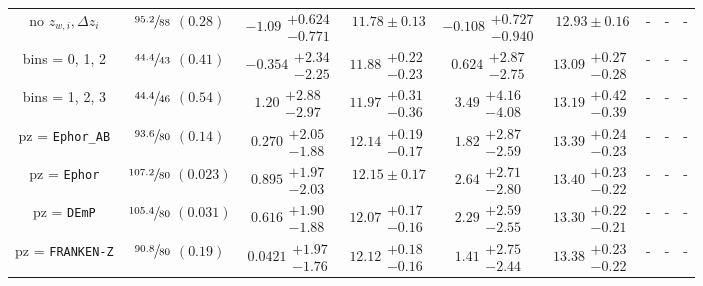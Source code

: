 \documentclass[a4paper,11pt]{article}
\begin{document}
\begin{table}
\begin{center}
\begin{tabular}{ccccccccc}
            no $z_{w, i}, \Delta z_{i}$ & $\sfrac{95.2}{88}$ $(0.28)$ & $-1.09\substack{+0.624 \\ -0.771}$ & $11.78 \pm 0.13$ & $-0.108\substack{+0.727 \\ -0.940}$ & $12.93 \pm 0.16$ & - & - & - \\
            bins = 0, 1, 2 & $\sfrac{44.4}{43}$ $(0.41)$ & $-0.354\substack{+2.34 \\ -2.25}$ & $11.88\substack{+0.22 \\ -0.23}$ & $0.624\substack{+2.87 \\ -2.75}$ & $13.09\substack{+0.27 \\ -0.28}$ & - & - & - \\
            bins = 1, 2, 3 & $\sfrac{44.4}{46}$ $(0.54)$ & $1.20\substack{+2.88 \\ -2.97}$ & $11.97\substack{+0.31 \\ -0.36}$ & $3.49\substack{+4.16 \\ -4.08}$ & $13.19\substack{+0.42 \\ -0.39}$ & - & - & - \\
            pz = \texttt{Ephor\_AB} & $\sfrac{93.6}{80}$ $(0.14)$ & $0.270\substack{+2.05 \\ -1.88}$ & $12.14\substack{+0.19 \\ -0.17}$ & $1.82\substack{+2.87 \\ -2.59}$ & $13.39\substack{+0.24 \\ -0.23}$ & - & - & - \\
            pz = \texttt{Ephor} & $\sfrac{107.2}{80}$ $(0.023)$ & $0.895\substack{+1.97 \\ -2.03}$ & $12.15 \pm 0.17$ & $2.64\substack{+2.71 \\ -2.80}$ & $13.40\substack{+0.23 \\ -0.22}$ & - & - & - \\
            pz = \texttt{DEmP} & $\sfrac{105.4}{80}$ $(0.031)$ & $0.616\substack{+1.90 \\ -1.88}$ & $12.07\substack{+0.17 \\ -0.16}$ & $2.29\substack{+2.59 \\ -2.55}$ & $13.30\substack{+0.22 \\ -0.21}$ & - & - & - \\
            pz = \texttt{FRANKEN-Z} & $\sfrac{90.8}{80}$ $(0.19)$ & $0.0421\substack{+1.97 \\ -1.76}$ & $12.12\substack{+0.18 \\ -0.16}$ & $1.41\substack{+2.75 \\ -2.44}$ & $13.38\substack{+0.23 \\ -0.22}$ & - & - & - \\

\end{tabular}
\end{center}
\end{table}
\end{document}
